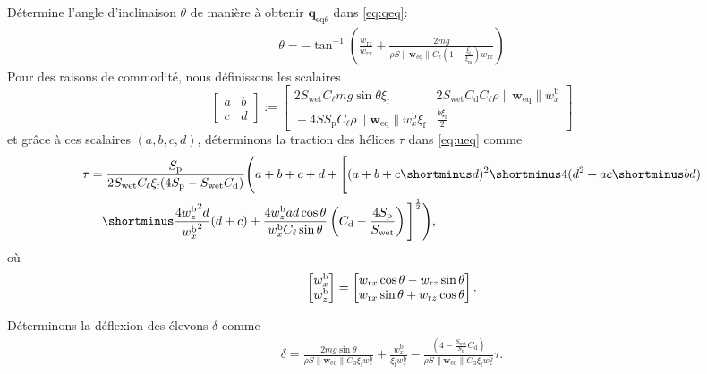 \begin{algorithm}
\begin{algorithmic}[1]
        \State Détermine l'angle d'inclinaison $\theta$ de manière à obtenir $\boldsymbol{q}_{\text{eq}\theta}$ dans \eqref{eq:qeq}:  
        \begin{align}
        \label{eq:theta_alg}
            \theta = -\tan^{-1}\left(\frac{w_{\text{r}z}}{w_{\text{r}x}} + \frac{2mg}{\rho S \lVert \boldsymbol{w}_{\mathrm{eq}} \rVert C_{\ell}  (1-\frac{\xi_{\text{f}}}{\xi_{\text{m}}}) w_{\text{r}x} } \right)
        \end{align}
    \State Pour des raisons de commodité, nous définissons les scalaires 
        $$ 
        \left[\begin{array}{c|c} 
        \!\!a\!\!&\!\!b\!\! \\ \hline \!\!c\!\!&\!\! d\!\!\end{array}  \right] \!:=\! 
        \left[\begin{array}{c|c}
        2 S_{\text{wet}} C_{\ell} mg \sin{\theta} \xi_{\text{f}} &
        \! 2 S_{\text{wet}} C_{\text{d}} C_{\ell} \rho  \lVert \boldsymbol{w}_{\mathrm{eq}} \rVert  w_{x}^{\text{b}}\!\! \\ \hline
        \!\!-4 S S_{\text{p}} C_{\ell} \rho  \lVert \boldsymbol{w}_{\mathrm{eq}} \rVert  w_{x}^{\text{b}} \xi_{\text{f}}\!\! & \frac{b \xi_{\text{f}}}{2}
        \end{array}\right]
        $$ 
        et grâce à ces scalaires $(a,b,c,d)$, déterminons la traction des hélices $\tau$ dans \eqref{eq:ueq} comme
        \begin{align}
            \nonumber
            \tau &= \frac{S_{\text{p}}}{2 S_{\text{wet}} C_{\ell} \xi_{\text{f}} (4S_{\text{p}} -  S_{\text{wet}} C_{\text{d}} )} \Bigg( a+b+c+d + \Bigg[ (a+b+c \shortminus d)^2 \shortminus 4 (d^2+ac \shortminus bd)  \\ 
            & \quad
            \shortminus \frac{4 {w_{z}^{\text{b}}}^2 d}{ {w_{x}^{\text{b}}}^2 } (d+c) + \frac{4 w_{z}^{\text{b}}ad\cos{\theta}}{w_{x}^{\text{b}} C_{\ell} \sin{\theta} } \left(C_{\text{d}} - \frac{4 S_{\text{p}}}{S_{\text{wet}}}\right) \Bigg] ^{\frac{1}{2}} \Bigg),\label{eq:tau_alg}
        \end{align}
        où
        $$
        \begin{bmatrix}w_{x}^{\text{b}} \\ w_{z}^{\text{b}} \end{bmatrix} = \begin{bmatrix}   w_{\text{r}x} \cos{\theta} - w_{\text{r}z} \sin{\theta}\\
                    w_{\text{r}x} \sin{\theta} +  w_{\text{r}z} \cos{\theta}  \end{bmatrix}.
        $$
        
        \State Déterminons la déflexion des élevons $\delta$ comme
        \begin{align}
        \label{eq:delta_alg}
            \delta = \frac{2mg\sin{\theta}}{\rho S \lVert \boldsymbol{w}_{\mathrm{eq}} \rVert C_{\text{d}}\xi_{\text{f}} w_{z}^{\text{b}}} + \frac{w_{x}^{\text{b}}}{\xi_{\text{f}}w_{z}^{\text{b}}} -  \frac{(4-\frac{S_{\text{wet}}}{S_{\text{p}}} C_{\text{d}})}{\rho S \lVert \boldsymbol{w}_{\mathrm{eq}} \rVert C_{\text{d}}\xi_{\text{f}} w_{z}^{\text{b}}} \tau.
        \end{align}


\end{algorithmic}
\end{algorithm}
